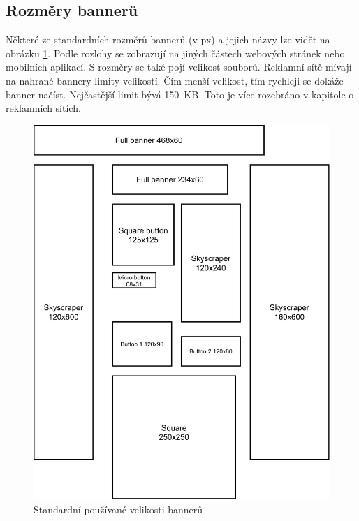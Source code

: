     \subsection{Rozměry bannerů}
    Některé ze standardních rozměrů bannerů (v px) a jejich názvy lze vidět na obrázku \ref{fig:banner-sizes}. Podle rozlohy se zobrazují na jiných částech webových stránek nebo
    mobilních aplikací. S rozměry se také pojí velikost souborů. Reklamní sítě mívají na nahrané bannery limity velikostí.
    Čím menší velikost, tím rychleji se dokáže banner načíst. Nejčastější limit bývá 150~KB. Toto je více rozebráno v kapitole o reklamních sítích.

    \begin{figure}[h]
        \centering
        \includegraphics[width=1\textwidth]{Figures/banner-sizes.pdf}
        \caption[Velikosti bannerů]{Standardní používané velikosti bannerů}
        \label{fig:banner-sizes}
    \end{figure}

